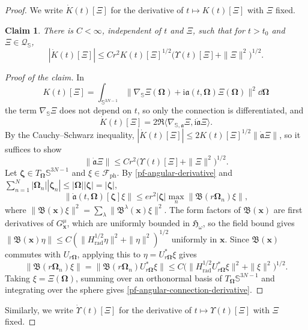 \documentclass[final,reqno]{amsart}
\newtheorem*{claim}{Claim}
\theoremstyle{remark}
\renewcommand{\i}{\mathrm{i}}
\newcommand{\dua}[2]{\langle #1, #2 \rangle}
\newcommand{\BF}{\bm{\mathfrak{B}}}
\newcommand{\Bf}{\mathfrak{B}}
\newcommand{\ph}{\mathrm{ph}}
\newcommand{\rad}{\mathrm{rad}}
\newcommand{\Fock}{\mathcal{F}}
\newcommand{\Hil}{\mathfrak{H}}
\newcommand{\vzeta}{{\bm{\zeta}}}
\newcommand{\vOmega}{{\bm{\Omega}}}
\newcommand{\vx}{\mathbf{x}}
\begin{document}
\begin{proof}
We write $\dot K(t)[\Xi]$ for the derivative of $t\mapsto K(t)[\Xi]$ with $\Xi$
fixed.

\begin{claim}
There is $C<\infty$, independent of $t$ and $\Xi$, such that for
$t>t_0$ and $\Xi\in\mathcal Q_{\mathbb S}$,
\begin{equation}\label{pf-angular-form-derivative}
 |\dot K(t)[\Xi]|
 \leq Cr^2K(t)[\Xi]^{1/2}
                     \big(\Upsilon(t)[\Xi]+\|\Xi\|^2\big)^{1/2}.
\end{equation}
\end{claim}

\begin{proof}[Proof of the claim]
In
\[
 K(t)[\Xi]=\int_{\mathbb S^{3N-1}}
   \|\nabla_{\mathbb S}\Xi(\vOmega)+\i\mathfrak a(t,\vOmega)\Xi(\vOmega)\|^2\dd\vOmega
\]
the term $\nabla_{\mathbb S}\Xi$ does not depend on $t$, so only the
connection is differentiated, and
\[
 \dot K(t)[\Xi]=2\Re\dua{\nabla_{\mathbb S,\mathfrak a}\Xi}
 {\i\dot{\mathfrak a}\Xi}.
\]
By the Cauchy--Schwarz inequality,
$|\dot K(t)[\Xi]|\leq2K(t)[\Xi]^{1/2}\|\dot{\mathfrak a}\Xi\|$, so it
suffices to show
\begin{equation}\label{pf-angular-connection-derivative}
 \|\dot{\mathfrak a}\Xi\|
 \leq Cr^2\big(\Upsilon(t)[\Xi]+\|\Xi\|^2\big)^{1/2}.
\end{equation}
Let $\vzeta\in T_\vOmega\mathbb S^{3N-1}$ and $\xi\in\Fock_\ph$.  By \cref{pf-angular-derivative} and
$\sum_{n=1}^N|\vOmega_n||\vzeta_n|\leq|\vOmega||\vzeta|=|\vzeta|$,
\[
 \|\dot{\mathfrak a}(t,\vOmega)[\vzeta]\xi\|
 \leq er^2|\vzeta|\max_n\|\BF(r\vOmega_n)\xi\|,
\]
where $\|\BF(\vx)\xi\|^2=\sum_\lambda\|\Bf^\lambda(\vx)\xi\|^2$.  The
form factors of $\BF(\vx)$ are first derivatives of $G^\mu_\vx$, which
are uniformly bounded in $\Hil_\omega$, so the field bound gives
$\|\BF(\vx)\eta\|\leq C(\|H_\rad^{1/2}\eta\|^2+\|\eta\|^2)^{1/2}$
uniformly in $\vx$.  Since $\BF(\vx)$ commutes with $U_{r\vOmega}$,
applying this to $\eta=U_{r\vOmega}^*\xi$ gives
\[
 \|\BF(r\vOmega_n)\xi\|=\|\BF(r\vOmega_n)U_{r\vOmega}^*\xi\|
 \leq C\big(\|H_\rad^{1/2}U_{r\vOmega}^*\xi\|^2+\|\xi\|^2\big)^{1/2}.
\]
Taking $\xi=\Xi(\vOmega)$, summing over an orthonormal basis of
$T_\vOmega\mathbb S^{3N-1}$ and integrating over the sphere gives
\cref{pf-angular-connection-derivative}.
\end{proof}

Similarly, we write $\dot\Upsilon(t)[\Xi]$ for the derivative of
$t\mapsto\Upsilon(t)[\Xi]$ with $\Xi$ fixed.


\end{proof}
\end{document}
